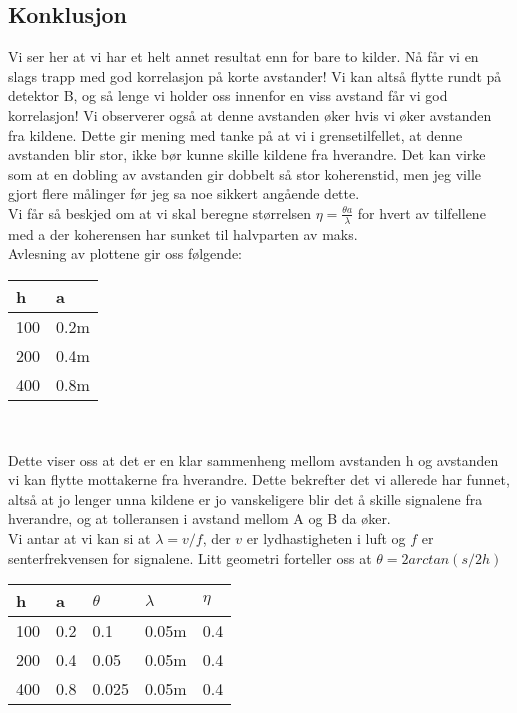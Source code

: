 \documentclass[12pt,norsk,a4paper]{article}
\begin{document}
\subsection{Konklusjon}
Vi ser her at vi har et helt annet resultat enn for bare to kilder.
Nå får vi en slags trapp med god korrelasjon på korte avstander! 
Vi kan altså flytte rundt på detektor B, og så lenge vi holder oss innenfor en viss avstand får vi god korrelasjon! 
Vi observerer også at denne avstanden øker hvis vi øker avstanden fra kildene. Dette gir mening med tanke på at vi i grensetilfellet, at denne avstanden blir stor, ikke bør kunne skille kildene fra hverandre. Det kan virke som at en dobling av avstanden gir dobbelt så stor koherenstid, men jeg ville gjort flere målinger før jeg sa noe sikkert angående dette.\\
Vi får så beskjed om at vi skal beregne størrelsen $ \eta = \frac{\theta a}{\lambda}$ for hvert av tilfellene med a der koherensen har sunket til halvparten av maks.\\
Avlesning av plottene gir oss følgende:\\
\begin{center}
\begin{tabular}{| l | l |}
 \hline
  h			& a\\
 \hline
  100		&  0.2m\\
  200		&  0.4m\\
  400		&  0.8m\\
 \hline
\end{tabular}\\
\end{center}
Dette viser oss at det er en klar sammenheng mellom avstanden h og avstanden vi kan flytte mottakerne fra hverandre. Dette bekrefter det vi allerede har funnet, altså at jo lenger unna kildene er jo vanskeligere blir det å skille signalene fra hverandre, og at tolleransen i avstand mellom A og B da øker.\\
Vi antar at vi kan si at $\lambda = v/f$, der $v$ er lydhastigheten i luft og $f$ er senterfrekvensen for signalene. Litt geometri forteller oss at $\theta = 2arctan(s/2h)$
\begin{center}
\begin{tabular}{| l | l | l | l | l |}
 \hline
  h			& a 		& $\theta$		& $\lambda$	&	$\eta$	\\
 \hline
  100		& 0.2    	& 0.1			&0.05m			& 0.4\\
  200		& 0.4  		& 0.05			&0.05m			& 0.4 \\
  400		& 0.8  		& 0.025		&0.05m			& 0.4\\
 \hline
\end{tabular}\\
\end{center}
\end{document}
